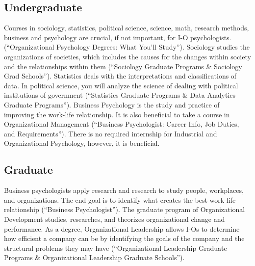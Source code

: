     \subsection{Undergraduate}
        Courses in sociology, statistics, political science, science, math, research methods, business and psychology are crucial, if not important, for I-O psychologists. (“Organizational Psychology Degrees: What You’ll Study”). Sociology studies the organizations of societies, which includes the causes for the changes within society and the relationships within them (“Sociology Graduate Programs \& Sociology Grad Schools”). Statistics deals with the interpretations and classifications of data. In political science, you will analyze the science of dealing with political institutions of government (“Statistics Graduate Programs \& Data Analytics Graduate Programs”). Business Psychology is the study and practice of improving the work-life relationship. It is also beneficial to take a course in Organizational Management (“Business Psychologist: Career Info, Job Duties, and Requirements”). There is no required internship for Industrial and Organizational Psychology, however, it is beneficial. 
    \subsection{Graduate}
        Business psychologists apply research and research to study people, workplaces, and organizations. The end goal is to identify what creates the best work-life relationship (“Business Psychologist”). The graduate program of Organizational Development studies, researches, and theorizes organizational change and performance. As a degree, Organizational Leadership allows I-Os to determine how efficient a company can be by identifying the goals of the company and the structural problems they may have (“Organizational Leadership Graduate Programs \& Organizational Leadership Graduate Schools”).

